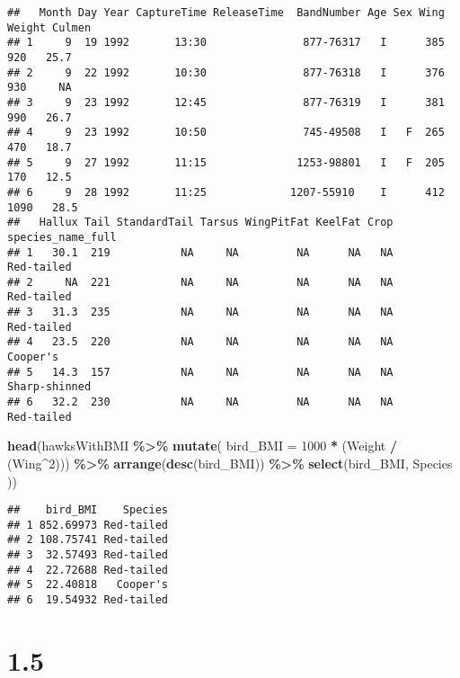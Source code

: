 \documentclass[
]{article}
\newenvironment{Shaded}{\begin{snugshade}}{\end{snugshade}}
\newcommand{\AttributeTok}[1]{\textcolor[rgb]{0.13,0.29,0.53}{#1}}
\newcommand{\DecValTok}[1]{\textcolor[rgb]{0.00,0.00,0.81}{#1}}
\newcommand{\FunctionTok}[1]{\textcolor[rgb]{0.13,0.29,0.53}{\textbf{#1}}}
\newcommand{\NormalTok}[1]{#1}
\newcommand{\SpecialCharTok}[1]{\textcolor[rgb]{0.81,0.36,0.00}{\textbf{#1}}}
\begin{document}
\begin{verbatim}
##   Month Day Year CaptureTime ReleaseTime  BandNumber Age Sex Wing Weight Culmen
## 1     9  19 1992       13:30               877-76317   I      385    920   25.7
## 2     9  22 1992       10:30               877-76318   I      376    930     NA
## 3     9  23 1992       12:45               877-76319   I      381    990   26.7
## 4     9  23 1992       10:50               745-49508   I   F  265    470   18.7
## 5     9  27 1992       11:15              1253-98801   I   F  205    170   12.5
## 6     9  28 1992       11:25             1207-55910    I      412   1090   28.5
##   Hallux Tail StandardTail Tarsus WingPitFat KeelFat Crop species_name_full
## 1   30.1  219           NA     NA         NA      NA   NA        Red-tailed
## 2     NA  221           NA     NA         NA      NA   NA        Red-tailed
## 3   31.3  235           NA     NA         NA      NA   NA        Red-tailed
## 4   23.5  220           NA     NA         NA      NA   NA          Cooper's
## 5   14.3  157           NA     NA         NA      NA   NA     Sharp-shinned
## 6   32.2  230           NA     NA         NA      NA   NA        Red-tailed
\end{verbatim}

\begin{Shaded}
\begin{Highlighting}[]
\FunctionTok{head}\NormalTok{(hawksWithBMI }\SpecialCharTok{\%\textgreater{}\%}
    \FunctionTok{mutate}\NormalTok{( }\AttributeTok{bird\_BMI =} \DecValTok{1000} \SpecialCharTok{*}\NormalTok{ (Weight }\SpecialCharTok{/}\NormalTok{ (Wing}\SpecialCharTok{\^{}}\DecValTok{2}\NormalTok{))) }\SpecialCharTok{\%\textgreater{}\%}
    \FunctionTok{arrange}\NormalTok{(}\FunctionTok{desc}\NormalTok{(bird\_BMI)) }\SpecialCharTok{\%\textgreater{}\%}
    \FunctionTok{select}\NormalTok{(bird\_BMI,  Species ))}
\end{Highlighting}
\end{Shaded}

\begin{verbatim}
##    bird_BMI    Species
## 1 852.69973 Red-tailed
## 2 108.75741 Red-tailed
## 3  32.57493 Red-tailed
## 4  22.72688 Red-tailed
## 5  22.40818   Cooper's
## 6  19.54932 Red-tailed
\end{verbatim}

\hypertarget{section-1}{%
\section{1.5}\label{section-1}}
\end{document}
